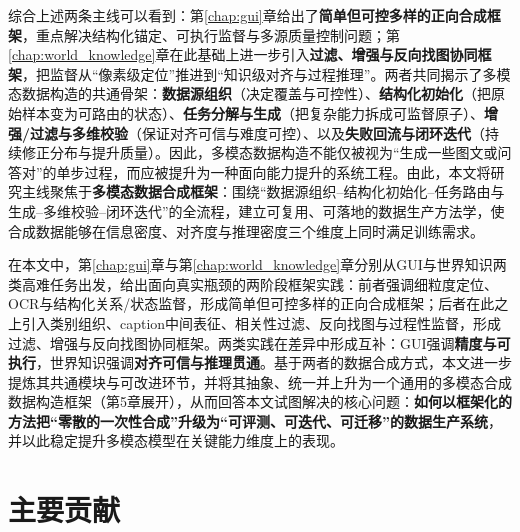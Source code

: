 综合上述两条主线可以看到：第\ref{chap:gui}章给出了\textbf{简单但可控多样的正向合成框架}，重点解决结构化锚定、可执行监督与多源质量控制问题；第\ref{chap:world_knowledge}章在此基础上进一步引入\textbf{过滤、增强与反向找图协同框架}，把监督从“像素级定位”推进到“知识级对齐与过程推理”。两者共同揭示了多模态数据构造的共通骨架：\textbf{数据源组织}（决定覆盖与可控性）、\textbf{结构化初始化}（把原始样本变为可路由的状态）、\textbf{任务分解与生成}（把复杂能力拆成可监督原子）、\textbf{增强/过滤与多维校验}（保证对齐可信与难度可控）、以及\textbf{失败回流与闭环迭代}（持续修正分布与提升质量）。因此，多模态数据构造不能仅被视为“生成一些图文或问答对”的单步过程，而应被提升为一种面向能力提升的系统工程。由此，本文将研究主线聚焦于\textbf{多模态数据合成框架}：围绕“数据源组织--结构化初始化--任务路由与生成--多维校验--闭环迭代”的全流程，建立可复用、可落地的数据生产方法学，使合成数据能够在信息密度、对齐度与推理密度三个维度上同时满足训练需求。

在本文中，第\ref{chap:gui}章与第\ref{chap:world_knowledge}章分别从GUI与世界知识两类高难任务出发，给出面向真实瓶颈的两阶段框架实践：前者强调细粒度定位、OCR与结构化关系/状态监督，形成简单但可控多样的正向合成框架；后者在此之上引入类别组织、caption中间表征、相关性过滤、反向找图与过程性监督，形成过滤、增强与反向找图协同框架。两类实践在差异中形成互补：GUI强调\textbf{精度与可执行}，世界知识强调\textbf{对齐可信与推理贯通}。基于两者的数据合成方式，本文进一步提炼其共通模块与可改进环节，并将其抽象、统一并上升为一个通用的多模态合成数据构造框架（第5章展开），从而回答本文试图解决的核心问题：\textbf{如何以框架化的方法把“零散的一次性合成”升级为“可评测、可迭代、可迁移”的数据生产系统}，并以此稳定提升多模态模型在关键能力维度上的表现。

\section{主要贡献}

